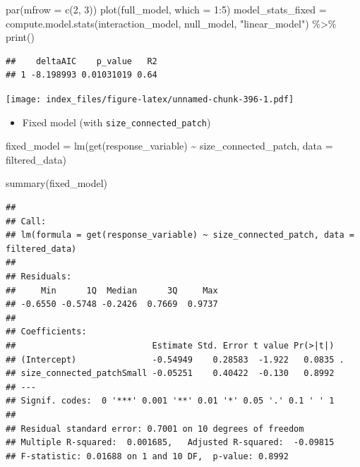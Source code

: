 \documentclass[
]{article}
\newenvironment{Shaded}{\begin{snugshade}}{\end{snugshade}}
\newcommand{\AttributeTok}[1]{\textcolor[rgb]{0.77,0.63,0.00}{#1}}
\newcommand{\DecValTok}[1]{\textcolor[rgb]{0.00,0.00,0.81}{#1}}
\newcommand{\FunctionTok}[1]{\textcolor[rgb]{0.00,0.00,0.00}{#1}}
\newcommand{\NormalTok}[1]{#1}
\newcommand{\OtherTok}[1]{\textcolor[rgb]{0.56,0.35,0.01}{#1}}
\newcommand{\SpecialCharTok}[1]{\textcolor[rgb]{0.00,0.00,0.00}{#1}}
\newcommand{\StringTok}[1]{\textcolor[rgb]{0.31,0.60,0.02}{#1}}
\providecommand{\tightlist}{%
  \setlength{\itemsep}{0pt}\setlength{\parskip}{0pt}}
\begin{document}
\begin{Shaded}
\begin{Highlighting}[]
\FunctionTok{par}\NormalTok{(}\AttributeTok{mfrow =} \FunctionTok{c}\NormalTok{(}\DecValTok{2}\NormalTok{, }\DecValTok{3}\NormalTok{))}
\FunctionTok{plot}\NormalTok{(full\_model, }\AttributeTok{which =} \DecValTok{1}\SpecialCharTok{:}\DecValTok{5}\NormalTok{)}
\NormalTok{model\_stats\_fixed }\OtherTok{=} \FunctionTok{compute.model.stats}\NormalTok{(interaction\_model,}
\NormalTok{                                        null\_model,}
                                        \StringTok{"linear\_model"}\NormalTok{) }\SpecialCharTok{\%\textgreater{}\%}
  \FunctionTok{print}\NormalTok{()}
\end{Highlighting}
\end{Shaded}

\begin{verbatim}
##    deltaAIC    p_value   R2
## 1 -8.198993 0.01031019 0.64
\end{verbatim}

\texttt{[image: index\_files/figure-latex/unnamed-chunk-396-1.pdf]}

\begin{itemize}
\tightlist
\item
  Fixed model (with \texttt{size\_connected\_patch})
\end{itemize}

\begin{Shaded}
\begin{Highlighting}[]
\NormalTok{fixed\_model }\OtherTok{=} \FunctionTok{lm}\NormalTok{(}\FunctionTok{get}\NormalTok{(response\_variable) }\SpecialCharTok{\textasciitilde{}}
\NormalTok{                   size\_connected\_patch,}
                 \AttributeTok{data =}\NormalTok{ filtered\_data)}

\FunctionTok{summary}\NormalTok{(fixed\_model)}
\end{Highlighting}
\end{Shaded}

\begin{verbatim}
## 
## Call:
## lm(formula = get(response_variable) ~ size_connected_patch, data = filtered_data)
## 
## Residuals:
##     Min      1Q  Median      3Q     Max 
## -0.6550 -0.5748 -0.2426  0.7669  0.9737 
## 
## Coefficients:
##                           Estimate Std. Error t value Pr(>|t|)  
## (Intercept)               -0.54949    0.28583  -1.922   0.0835 .
## size_connected_patchSmall -0.05251    0.40422  -0.130   0.8992  
## ---
## Signif. codes:  0 '***' 0.001 '**' 0.01 '*' 0.05 '.' 0.1 ' ' 1
## 
## Residual standard error: 0.7001 on 10 degrees of freedom
## Multiple R-squared:  0.001685,   Adjusted R-squared:  -0.09815 
## F-statistic: 0.01688 on 1 and 10 DF,  p-value: 0.8992
\end{verbatim}
\end{document}
